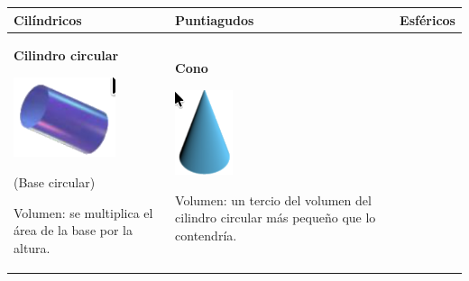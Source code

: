 \documentclass[12pt,a4paper]{article}
\begin{document}
	
		\begin{center}
		\small
		\renewcommand{\arraystretch}{1.25}
		\begin{tabular}{|p{4cm}|p{4cm}|p{4cm}|}
		\hline
		\textbf{Cilíndricos} & \textbf{Puntiagudos} & \textbf{Esféricos} \\
		\hline
		\textbf{Cilindro circular}\par
		{\centering \includegraphics[width=3cm]{Figuras/fig3.png}\par}
		(Base circular)\par
		Volumen: se multiplica el área de la base por la altura.
		&
		\textbf{Cono}\par
		{\centering \includegraphics[width=1.7cm]{Figuras/fig16.png}\par}
		Volumen: un tercio del volumen del cilindro circular más pequeño que lo contendría.
		&
		\\
		\hline
	\end{tabular}
\end{center}


\vspace{4mm}

\end{document}
